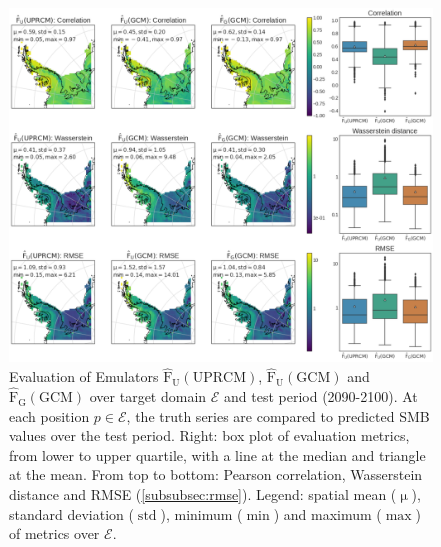 \documentclass[a4paper,11pt,oneside]{report}
\begin{document}
\begin{figure}[!ht]
  \centering
  \includegraphics[width=\columnwidth]{doc/Thesis-latex/images/results/metrics_RCM_GCM.pdf}
  \caption []{\small Evaluation of Emulators $\mathrm{\hat{F}_{U}(UPRCM)}$,  $\mathrm{\hat{F}_{U}(GCM)}$ and $\mathrm{\hat{F}_{G}(GCM)}$ over target domain $\mathcal{E}$ and test period (2090-2100). At each position $p \in\mathcal{E}$, the truth series are compared to predicted SMB values over the test period. Right: box plot of evaluation metrics, from lower to upper quartile, with a line at the median and triangle at the mean. From top to bottom: Pearson correlation, Wasserstein distance and RMSE (\autoref{subsubsec:rmse}). Legend: spatial mean ($\operatorname{\mu}$), standard deviation ($\operatorname{std}$), minimum ($\min$) and maximum ($\max$) of metrics over $\mathcal{E}$.}
  \vspace{-3mm}
  \label{fig:evaluation-GCM-RCM}
\end{figure}
\end{document}
